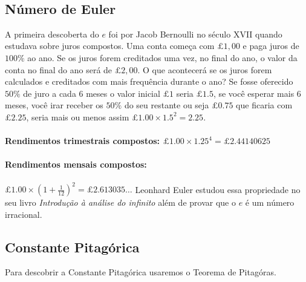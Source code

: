 \documentclass[a4paper]{article}
\begin{document}
\\

\subsection{Número de Euler}
A primeira descoberta do $e$ foi por Jacob Bernoulli no século XVII quando estudava sobre juros compostos.
Uma conta começa com $\pounds1,00$ e paga juros de $100\%$ ao ano. Se os juros forem creditados uma vez, no final do ano, o valor da conta no final do ano será de $\pounds2,00$.
O que acontecerá se os juros forem calculados e creditados com mais frequência durante o ano?
Se fosse oferecido $50\%$ de juro a cada $6$ meses o valor inicial $\pounds1$ seria $\pounds1.5$, se você esperar mais $6$ meses, você irar receber os $50\%$ do seu restante ou seja $\pounds0.75$
que ficaria com $\pounds2.25$, seria mais ou menos assim $\pounds 1.00 \times 1.5^2 = 2.25$.

\paragraph{Rendimentos trimestrais compostos: $\pounds1.00 \times 1.25^4 = \pounds2.44140625$}
\paragraph{Rendimentos mensais compostos:} $\pounds1.00 \times \left(1+\frac{1}{12} \right)^2 = \pounds2.613035\dots$
\newline
\newline
Leonhard Euler estudou essa propriedade no seu livro \emph{Introdução à análise do infinito} além de provar que o $e$ é um número irracional.

\subsection{Constante Pitagórica}
Para descobrir a Constante Pitagórica usaremos o Teorema de Pitagóras.
\end{document}
